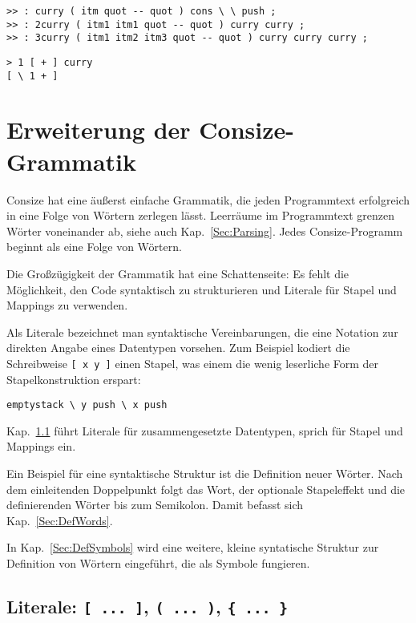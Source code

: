 \begin{verbatim}
>> : curry ( itm quot -- quot ) cons \ \ push ;
>> : 2curry ( itm1 itm1 quot -- quot ) curry curry ;
>> : 3curry ( itm1 itm2 itm3 quot -- quot ) curry curry curry ;
\end{verbatim}

\begin{verbatim}
> 1 [ + ] curry
[ \ 1 + ]
\end{verbatim}

\section{Erweiterung der Consize-Grammatik}
\label{Sec:Grammatik+}

Consize hat eine äußerst einfache Grammatik, die jeden Programmtext erfolgreich in eine Folge von Wörtern zerlegen lässt. Leerräume im Programmtext grenzen Wörter voneinander ab, siehe auch Kap.~\ref{Sec:Parsing}. Jedes Consize-Programm beginnt als eine Folge von Wörtern.

Die Großzügigkeit der Grammatik hat eine Schattenseite: Es fehlt die Möglichkeit, den Code syntaktisch zu strukturieren und Literale für Stapel und Mappings zu verwenden.

Als Literale bezeichnet man syntaktische Vereinbarungen, die eine Notation zur direkten Angabe eines Datentypen vorsehen. Zum Beispiel kodiert die Schreibweise \verb|[ x y ]| einen Stapel, was einem die wenig leserliche Form der Stapelkonstruktion erspart:

\begin{verbatim}
emptystack \ y push \ x push
\end{verbatim}

Kap.~\ref{Sec:Literale} führt Literale für zusammengesetzte Datentypen, sprich für Stapel und Mappings ein.

Ein Beispiel für eine syntaktische Struktur ist die Definition neuer Wörter. Nach dem einleitenden Doppelpunkt folgt das Wort, der optionale Stapeleffekt und die definierenden Wörter bis zum Semikolon. Damit befasst sich Kap.~\ref{Sec:DefWords}.

In Kap.~\ref{Sec:DefSymbols} wird eine weitere, kleine syntatische Struktur zur Definition von Wörtern eingeführt, die als Symbole fungieren.

\subsection{Literale: \texttt{[ ... ]}, \texttt{( ... )}, \texttt{\{ ... \}}}
\label{Sec:Literale}

